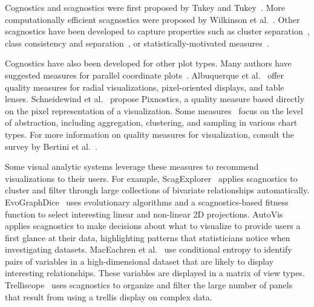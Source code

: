 Cognostics and scagnostics were first proposed by Tukey and Tukey~\cite{Tukey1982, Tukey1985}. More computationally efficient scagnostics were proposed by Wilkinson et al.~\cite{Wilkinson2005, Wilkinson2008}. Other scagnostics have been developed to capture properties such as cluster separation~\cite{Sedlmair2012, Tatu2009}, class consistency and separation~\cite{Sips2009, Schafer2013}, or statistically-motivated measures~\cite{Kandel2012, Seo2005, Piringer2008}.

Cognostics have also been developed for other plot types. Many authors have suggested measures for parallel coordinate plots~\cite{Ankerst1998, Dasgupta2010, Johansson2009, Yang2003}. Albuquerque et al.~\cite{Albuquerque2010} offer quality measures for radial visualizations, pixel-oriented displays, and table lenses. Schneidewind et al.~\cite{Schneidewind2006} propose Pixnostics, a quality measure based directly on the pixel representation of a visualization. Some measures~\cite{Bertini2006, Cui2006, Yang2003} focus on the level of abstraction, including aggregation, clustering, and sampling in various chart types. For more information on quality measures for visualization, consult the survey by Bertini et al.~\cite{Bertini2011}. 

Some visual analytic systems leverage these measures to recommend visualizations to their users. For example, ScagExplorer~\cite{Dang2014} applies scagnostics to cluster and filter through large collections of bivariate relationships automatically.
EvoGraphDice~\cite{Boukhelifa2013} uses evolutionary algorithms and a scagnostics-based fitness function to select interesting linear and non-linear 2D projections.
AutoVis~\cite{Wills2010} applies scagnostics to make decisions about what to visualize to provide users a first glance at their data, highlighting patterns that statisticians notice when investigating datasets.
MacEachren et al.~\cite{Maceachren2003} use conditional entropy to identify pairs of variables in a high-dimensional dataset that are likely to display interesting relationships. These variables are displayed in a matrix of view types. Trelliscope~\cite{Hafen2013} uses scagnostics to organize and filter the large number of panels that result from using a trellis display on complex data.



